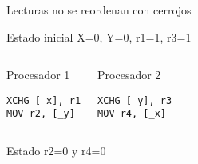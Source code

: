 \begin{frame}[t,fragile]{Lecturas no se reordenan con cerrojos}

\begin{block}{Estado inicial}
X=0, Y=0, r1=1, r3=1
\end{block}


\begin{columns}[T]


\begin{block}{Procesador 1}
\begin{lstlisting}[language={[x86masm]Assembler}]
XCHG [_x], r1
MOV r2, [_y]
\end{lstlisting}
\end{block}

\begin{block}{Procesador 2}
\begin{lstlisting}[language={[x86masm]Assembler}]
XCHG [_y], r3
MOV r4, [_x]
\end{lstlisting}
\end{block}

\end{columns}


\begin{block}{Estado }
r2=0 y r4=0
\end{block}

\end{frame}


